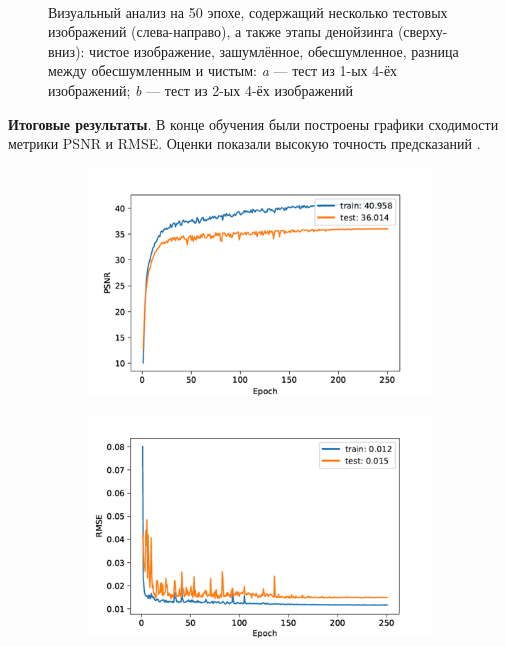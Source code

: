 \begin{figure}[H]
\begin{subfigure}[t]{\dimexpr.5\linewidth-1.3em\relax}
	\end{subfigure}
	\\[20pt]
	\captionsetup{justification=centering} %
	\caption{Визуальный анализ на 50 эпохе, содержащий несколько тестовых изображений (слева-направо), а также этапы денойзинга (сверху-вниз): чистое изображение, зашумлённое, обесшумленное, разница между обесшумленным и чистым: {\itshape a} --- тест из 1-ых 4-ёх изображений; {\itshape b} --- тест из 2-ых 4-ёх изображений} 
	\label{fig:train-iters}
\end{figure}

\textbf{Итоговые результаты}.
В конце обучения были построены графики сходимости метрики PSNR и RMSE. Оценки показали высокую точность предсказаний .

\begin{figure}[H]
	\begin{subfigure}[t]{\dimexpr.5\linewidth-1.3em\relax}
		\centering
		\includegraphics[width=.95\linewidth,valign=t]{my_folder/images/denoising/psnr_training.png}
	\end{subfigure}
	\hfill %
	\begin{subfigure}[t]{\dimexpr.5\linewidth-1.3em\relax}
		\centering
		\includegraphics[width=.95\linewidth,valign=t]{my_folder/images/denoising/rmse_training.png}

\end{subfigure}
\end{figure}
